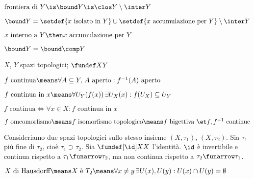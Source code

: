 \begin{defn}
$\text{frontiera di }Y\is\bound Y\is\clos Y\setminus\inter Y$
\end{defn}

\begin{prop}
$\bound Y=\setdef{x\text{ isolato in }Y}\cup\setdef{x\text{ accumulazione per }Y}\setminus\inter Y$
\end{prop}

\begin{oss}
$x\text{ interno a }Y\then x\text{ accumulazione per }Y$
\end{oss}

\begin{prop}
$\bound Y=\bound\comp Y$
\end{prop}


$X$, $Y$ spazi topologici; $\fundef XY$

\begin{defn}[Continuità]
$f\text{ continua}\means\forall A\subseteq Y,\,A\text{ aperto}:f^{-1}(A)\text{ aperto}$
\end{defn}

\begin{defn}
$f\text{ continua in }x\means\forall U_Y(f(x))\,\exists U_X(x):f(U_X)\subseteq U_Y$
\end{defn}

\begin{prop}
$f\text{ continua}\iff\forall x\in X:f\text{ continua in }x$
\end{prop}

\begin{defn}
$f\text{ omeomorfismo}\means f\text{ isomorfismo topologico}\means f\text{ bigettiva }\et f, f^{-1}\text{ continue}$
\end{defn}

\begin{es}
Consideriamo due spazi topologici sullo stesso insieme $(X,\tau_1)$, $(X,\tau_2)$. Sia $\tau_1$ più fine di $\tau_2$, cioè $\tau_1\supset\tau_2$. Sia $\fundef[\id]XX$ l'identità. $\id$ è invertibile e continua rispetto a $\tau_1\funarrow\tau_2$, ma non continua rispetto a $\tau_2\funarrow\tau_1$.
\end{es}

\begin{defn}
$X\text{ di Hausdorff}\means X\text{ è }T_2\means\forall x\neq y\,\exists U(x),U(y):U(x)\cap U(y)=\emptyset$
\end{defn}

